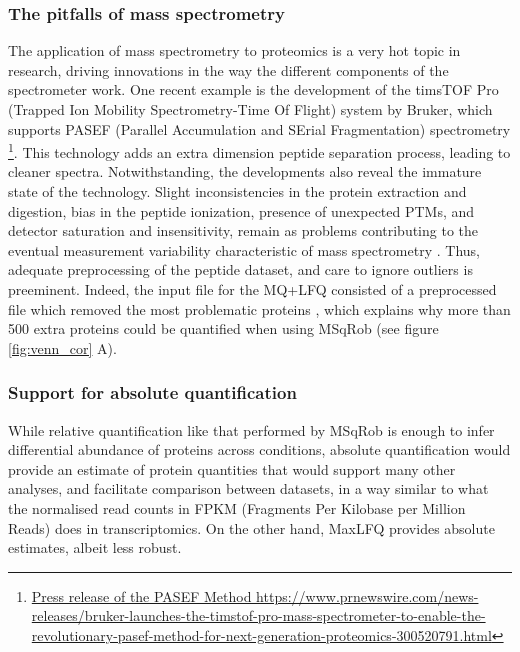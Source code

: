 \subsubsection{The pitfalls of mass spectrometry}

The application of mass spectrometry to proteomics is a very hot topic in research, driving innovations in the way the different components of the spectrometer work. One recent example is the development of the timsTOF\texttrademark\xspace Pro (Trapped Ion Mobility Spectrometry-Time Of Flight) system by Bruker, which supports PASEF (Parallel Accumulation and SErial Fragmentation) spectrometry \footnote{\href{https://www.prnewswire.com/news-releases/bruker-launches-the-timstof-pro-mass-spectrometer-to-enable-the-revolutionary-pasef-method-for-next-generation-proteomics-300520791.html}{Press release of the PASEF Method https://www.prnewswire.com/news-releases/bruker-launches-the-timstof-pro-mass-spectrometer-to-enable-the-revolutionary-pasef-method-for-next-generation-proteomics-300520791.html}}. This technology adds  an extra dimension peptide separation process, leading to cleaner spectra.
Notwithstanding, the developments also reveal the immature state of the technology. Slight inconsistencies in the protein extraction and digestion, bias in the peptide ionization, presence of unexpected PTMs, and detector saturation and insensitivity, remain as problems contributing to the eventual measurement variability characteristic of mass spectrometry \cite{Piehowski2013}. Thus, adequate preprocessing of the peptide dataset, and care to ignore outliers is preeminent. Indeed, the input file for the MQ+LFQ consisted of a preprocessed file which removed the most problematic proteins \cite{Cox2014}, which explains why more than 500 extra proteins could be quantified when using MSqRob (see figure \ref{fig:venn_cor} A).

\subsubsection{Support for absolute quantification}

While relative quantification like that performed by MSqRob is enough to infer differential abundance of proteins across conditions, absolute quantification would provide an estimate of protein quantities that would support many other analyses, and facilitate comparison between datasets, in a way similar to what the normalised read counts in FPKM (Fragments Per Kilobase per Million Reads) does in transcriptomics. On the other hand, MaxLFQ provides absolute estimates, albeit less robust.

